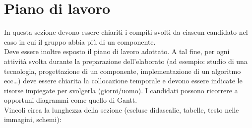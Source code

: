 \section{Piano di lavoro}

In questa sezione devono essere chiariti i compiti svolti da ciascun candidato nel caso in cui il gruppo abbia più di un componente.\\

Deve essere inoltre esposto il piano di lavoro adottato. A tal fine, per ogni attività svolta durante la preparazione dell'elaborato (ad esempio: studio di una tecnologia, progettazione di un componente, implementazione di un algoritmo ecc…) deve essere chiarita la collocazione temporale e devono essere indicate le risorse impiegate per svolgerla (giorni/uomo). I candidati possono ricorrere a opportuni diagrammi come quello di Gantt.\\


Vincoli circa la lunghezza della sezione (escluse didascalie, tabelle, testo nelle immagini, schemi):

